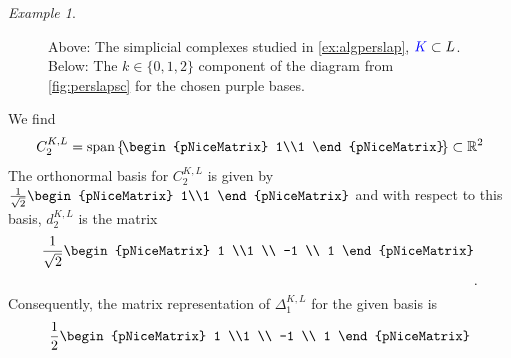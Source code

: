 \documentclass[11pt]{article}
\theoremstyle{definition}
\theoremstyle{remark}
\newtheorem{example}[theorem]{Example}
\newcommand{\Ff}{\mathcal{F}}
\newcommand{\Gg}{\mathcal{G}}
\newcommand{\R}{\mathbb{R}}
\begin{document}
\begin{example}
\begin{figure}[H]
        \caption{Above: The simplicial complexes studied in \cref{ex:algperslap}, $\textcolor{blue}{K} \subset L$. Below: The $k\in \{0,1,2\}$ component of the diagram from \cref{fig:perslapsc} for the chosen purple bases.}
        \label{fig:algexperslap}
    \end{figure}
    We find 
    $$
        C_2^{K,L} = \text{span}\left\{ \! \begin{pNiceMatrix}
            1\\1
        \end{pNiceMatrix}  \! \right\} \subset \R^2
    $$
    The orthonormal basis for $C_2^{K,L}$ is given by $\frac 1{\sqrt{2}} \begin{pNiceMatrix}
            1\\1
        \end{pNiceMatrix}$ and with respect to this basis, $d_2^{K,L}$ is the matrix
    $$\frac 1 {\sqrt{2}}\begin{pNiceMatrix}
            1 \\1 \\ -1 \\ 1
        \end{pNiceMatrix} \raisebox{-5ex}{.}$$
    Consequently, the matrix representation of $\Delta_1^{K,L}$ for the given basis is
    $$
        \frac{1}{2} \begin{pNiceMatrix}
            1 \\1 \\ -1 \\ 1

\end{pNiceMatrix}$$
\end{example}
\end{document}

